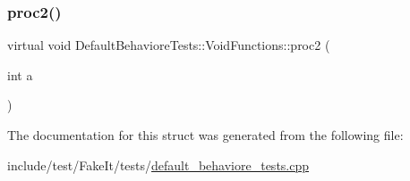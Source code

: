 \subsubsection{\texorpdfstring{proc2()}{proc2()}}
{\footnotesize\ttfamily virtual void Default\+Behaviore\+Tests\+::\+Void\+Functions\+::proc2 (\begin{DoxyParamCaption}\item[{int}]{a }\end{DoxyParamCaption})\hspace{0.3cm}{\ttfamily [pure virtual]}}



The documentation for this struct was generated from the following file\+:\begin{DoxyCompactItemize}
\item 
include/test/\+Fake\+It/tests/\mbox{\hyperlink{default__behaviore__tests_8cpp}{default\+\_\+behaviore\+\_\+tests.\+cpp}}\end{DoxyCompactItemize}
